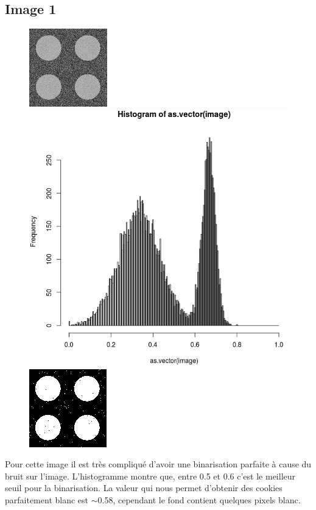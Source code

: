 \documentclass[a4paper,12pt]{report}
\begin{document}
\subsection*{Image 1}
\begin{figure}[!ht]
	\center
	\includegraphics[scale=0.5]{../rdf-2-classes-texture-1.png}
	\includegraphics[scale=0.3]{image/text1.png}
	\includegraphics[scale=0.5]{image/text11.png}
\end{figure}

Pour cette image il est très compliqué d'avoir une binarisation parfaite à cause du bruit sur l'image. L'histogramme montre que, entre 0.5 et 0.6 c'est le meilleur seuil pour la binarisation. La valeur qui nous permet d'obtenir des cookies parfaitement blanc est $\sim$0.58, cependant le fond contient quelques pixels blanc.
\end{document}
